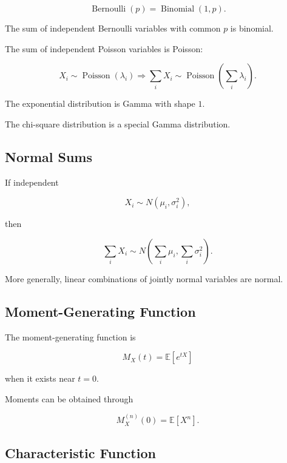 \[
\boxed{
\operatorname{Bernoulli}(p)
=
\operatorname{Binomial}(1,p).
}
\]

The sum of independent Bernoulli variables with common \(p\) is binomial.

The sum of independent Poisson variables is Poisson:

\[
\boxed{
X_i\sim\operatorname{Poisson}(\lambda_i)
\Longrightarrow
\sum_iX_i
\sim
\operatorname{Poisson}
\left(
\sum_i\lambda_i
\right).
}
\]

The exponential distribution is Gamma with shape \(1\).

The chi-square distribution is a special Gamma distribution.

\subsection{Normal Sums}
\label{subsec:normal-sums-reference}

If independent

\[
X_i
\sim
N(\mu_i,\sigma_i^2),
\]

then

\[
\boxed{
\sum_i X_i
\sim
N
\left(
\sum_i\mu_i,
\sum_i\sigma_i^2
\right).
}
\]

More generally, linear combinations of jointly normal variables are normal.

\subsection{Moment-Generating Function}
\label{subsec:mgf-distribution-reference}

The moment-generating function is

\[
\boxed{
M_X(t)
=
\mathbb{E}[e^{tX}]
}
\]

when it exists near \(t=0\).

Moments can be obtained through

\[
\boxed{
M_X^{(n)}(0)
=
\mathbb{E}[X^n].
}
\]

\subsection{Characteristic Function}
\label{subsec:characteristic-function-distribution-reference}

